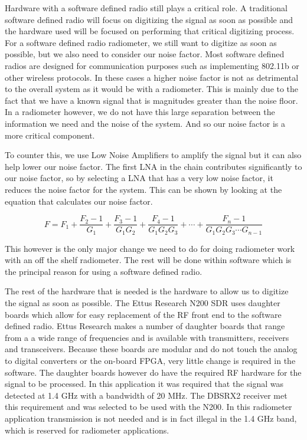 Hardware with a software defined radio still plays a critical role.  A traditional software defined radio will focus on digitizing the signal as soon as possible and the hardware used will be focused on performing that critical digitizing process.  For a software defined radio radiometer, we still want to digitize as soon as possible, but we also need to consider our noise factor.  Most software defined radios are designed for communication purposes such as implementing 802.11b or other wireless protocols.  In these cases a higher noise factor is not as detrimental to the overall system as it would be with a radiometer.  This is mainly due to the fact that we have a known signal that is magnitudes greater than the noise floor.  In a radiometer however, we do not have this large separation between the information we need and the noise of the system.  And so our noise factor is a more critical component.  

To counter this, we use Low Noise Amplifiers to amplify the signal but it can also help lower our noise factor.  The first LNA in the chain contributes significantly to our noise factor, so by selecting a LNA that has a very low noise factor, it reduces the noise factor for the system.  This can be shown by looking at the equation that calculates our noise factor.

\begin{equation}\label{noise_factor}
F=F_1+\frac{F_2-1}{G_1}+\frac{F_3-1}{G_1 G_2}+\frac{F_4-1}{G_1 G_2 G_3}+\cdots +\frac{F_n-1}{G_1 G_2 G_3 \cdots G_{n-1}}
\end{equation}

This however is the only major change we need to do for doing radiometer work with an off the shelf radiometer.  The rest will be done within software which is the principal reason for using a software defined radio.  

The rest of the hardware that is needed is the hardware to allow us to digitize the signal as soon as possible.  The Ettus Research N200 SDR uses daughter boards which allow for easy replacement of the RF front end to the software defined radio.  Ettus Research makes a number of daughter boards that range from a a wide range of frequencies and is available with transmitters, receivers and transceivers.  Because these boards are modular and do not touch the analog to digital converters or the on-board FPGA, very little change is required in the software.  The daughter boards however do have the required RF hardware for the signal to be processed.  In this application it was required that the signal was detected at 1.4 GHz with a bandwidth of 20 MHz.  The DBSRX2 receiver met this requirement and was selected to be used with the N200.  In this radiometer application transmission is not needed and is in fact illegal in the 1.4 GHz band, which is reserved for radiometer applications.

